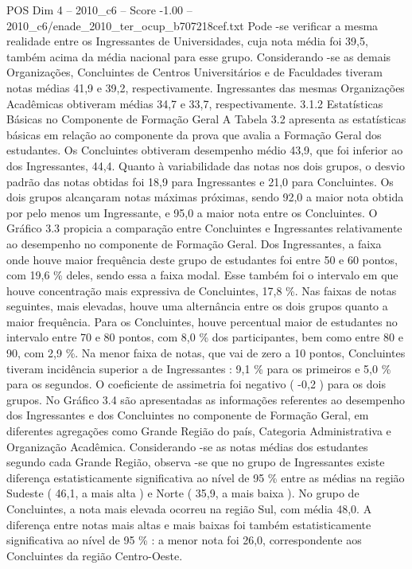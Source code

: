 \begin{textsample}{POS Dim 4 – 2010\_c6 – Score -1.00 – 2010\_c6/enade\_2010\_ter\_ocup\_b707218cef.txt}
Pode -se verificar a mesma realidade entre os Ingressantes de Universidades, cuja nota média foi 39,5, também acima da média nacional para esse grupo.
Considerando -se as demais Organizações, Concluintes de Centros Universitários e de Faculdades tiveram notas médias 41,9 e 39,2, respectivamente.
Ingressantes das mesmas Organizações Acadêmicas obtiveram médias 34,7 e 33,7, respectivamente. 3.1.2 Estatísticas Básicas no Componente de Formação Geral A Tabela 3.2 apresenta as estatísticas básicas em relação ao componente da prova que avalia a Formação Geral dos estudantes.
Os Concluintes obtiveram desempenho médio 43,9, que foi inferior ao dos Ingressantes, 44,4.
Quanto à variabilidade das notas nos dois grupos, o desvio padrão das notas obtidas foi 18,9 para Ingressantes e 21,0 para Concluintes.
Os dois grupos alcançaram notas máximas próximas, sendo 92,0 a maior nota obtida por pelo menos um Ingressante, e 95,0 a maior nota entre os Concluintes.
O Gráfico 3.3 propicia a comparação entre Concluintes e Ingressantes relativamente ao desempenho no componente de Formação Geral.
Dos Ingressantes, a faixa onde houve maior frequência deste grupo de estudantes foi entre 50 e 60 pontos, com 19,6 \% deles, sendo essa a faixa modal.
Esse também foi o intervalo em que houve concentração mais expressiva de Concluintes, 17,8 \%.
Nas faixas de notas seguintes, mais elevadas, houve uma alternância entre os dois grupos quanto a maior frequência.
Para os Concluintes, houve percentual maior de estudantes no intervalo entre 70 e 80 pontos, com 8,0 \% dos participantes, bem como entre 80 e 90, com 2,9 \%.
Na menor faixa de notas, que vai de zero a 10 pontos, Concluintes tiveram incidência superior a de Ingressantes : 9,1 \% para os primeiros e 5,0 \% para os segundos.
O coeficiente de assimetria foi negativo ( -0,2 ) para os dois grupos.
No Gráfico 3.4 são apresentadas as informações referentes ao desempenho dos Ingressantes e dos Concluintes no componente de Formação Geral, em diferentes agregações como Grande Região do país, Categoria Administrativa e Organização Acadêmica.
Considerando -se as notas médias dos estudantes segundo cada Grande Região, observa -se que no grupo de Ingressantes existe diferença estatisticamente significativa ao nível de 95 \% entre as médias na região Sudeste ( 46,1, a mais alta ) e Norte ( 35,9, a mais baixa ).
No grupo de Concluintes, a nota mais elevada ocorreu na região Sul, com média 48,0.
A diferença entre notas mais altas e mais baixas foi também estatisticamente significativa ao nível de 95 \% : a menor nota foi 26,0, correspondente aos Concluintes da região Centro-Oeste.

\end{textsample}
